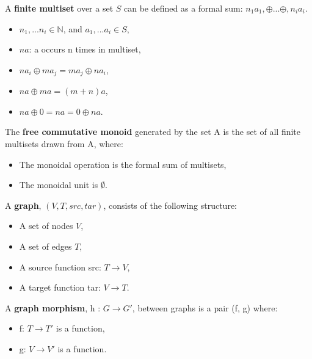\begin{definition}
  \label{def:Finite-Multiset}
  A \textbf{finite multiset} over a set $S$ can be defined as a formal sum: $n_1a_1, \oplus ... \oplus, n_ia_i$.
  \begin{itemize}
  \item  $n_1, ... n_i \in \mathbb{N}$, and $a_1, ... a_i \in S,$
  \item $na$: a occurs n times in multiset,
  \item $na_i \oplus ma_j = ma_j \oplus na_i$,
  \item $na \oplus ma = (m+n)a$,
  \item $na \oplus 0 = na = 0 \oplus na$.
  \end{itemize}
\end{definition}
%
\begin{definition}
  \label{def:Free-Commutative-Monoid}  
  The \textbf{free commutative monoid} generated by the set A is the set of all finite multisets drawn from A, where:
  \begin{itemize}
  \item The monoidal operation is the formal sum of multisets,
  \item The monoidal unit is $\emptyset$.
  \end{itemize}
\end{definition}
%
\begin{definition}
  \label{def:Graph}
  A \textbf{graph}, $(V, T, src, tar)$, consists of the following structure:  
  \begin{itemize}
  \item A set of nodes $V$,
  \item A set of edges $T$,
  \item A source function src: $T \to V$,
  \item A target function tar: $V \to T$.
  \end{itemize}
\end{definition}
%
\begin{definition}
  \label{def:Graph-Morphism}
  A \textbf{graph morphism}, h : $G \to G'$, between graphs is a pair (f, g) where:
  \begin{itemize}
  \item f: $T \to T'$ is a function,
  \item g: $V \to V'$ is a function.
  \end{itemize}
\end{definition}

